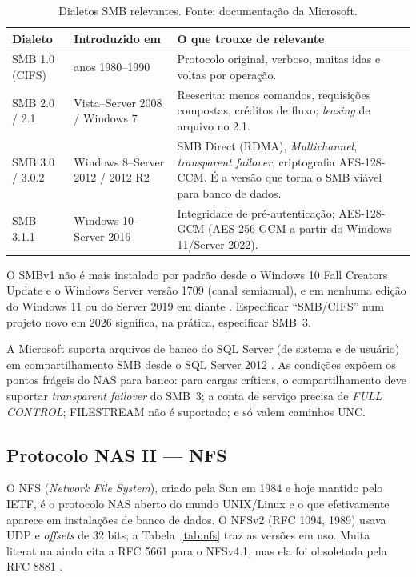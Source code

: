 \documentclass[11pt,a4paper]{article}
\begin{document}
\begin{table}[H]
\centering
\caption{Dialetos SMB relevantes. Fonte: documentação da Microsoft.}
\label{tab:smb}
{\footnotesize
\begin{tabular}{@{}L{2.1cm}L{3.6cm}L{9.0cm}@{}}
\toprule
\textbf{Dialeto} & \textbf{Introduzido em} & \textbf{O que trouxe de relevante} \\
\midrule
SMB 1.0 (CIFS) & anos 1980--1990 & Protocolo original, verboso, muitas idas e voltas por operação. \\
SMB 2.0 / 2.1 & Vista--Server 2008 / Windows 7 & Reescrita: menos comandos, requisições compostas, créditos de fluxo; \textit{leasing} de arquivo no 2.1. \\
SMB 3.0 / 3.0.2 & Windows 8--Server 2012 / 2012 R2 & SMB Direct (RDMA), \textit{Multichannel}, \textit{transparent failover}, criptografia AES-128-CCM. É a versão que torna o SMB viável para banco de dados. \\
SMB 3.1.1 & Windows 10--Server 2016 & Integridade de pré-autenticação; AES-128-GCM (AES-256-GCM a partir do Windows 11/Server 2022). \\
\bottomrule
\end{tabular}}
\end{table}

O SMBv1 não é mais instalado por padrão desde o Windows 10 Fall Creators Update e o Windows Server
versão 1709 (canal semianual), e em nenhuma edição do Windows 11 ou do Server 2019 em diante
\cite{mssmb1}. Especificar ``SMB/CIFS'' num projeto novo em 2026 significa, na prática, especificar
SMB~3.

A Microsoft suporta arquivos de banco do SQL Server (de sistema e de usuário) em compartilhamento SMB
desde o SQL Server 2012 \cite{mssqlsmb}. As condições expõem os pontos frágeis do NAS para banco: para
cargas críticas, o compartilhamento deve suportar \textit{transparent failover} do SMB~3; a conta de
serviço precisa de \textit{FULL CONTROL}; FILESTREAM não é suportado; e só valem caminhos UNC.

\subsection{Protocolo NAS II --- NFS}
\label{sec:nfs}

O NFS (\textit{Network File System}), criado pela Sun em 1984 e hoje mantido pelo IETF, é o protocolo
NAS aberto do mundo UNIX/Linux e o que efetivamente aparece em instalações de banco de dados. O NFSv2
(RFC 1094, 1989) usava UDP e \textit{offsets} de 32 bits; a Tabela~\ref{tab:nfs} traz as versões em uso.
Muita literatura ainda cita a RFC 5661 para o NFSv4.1, mas ela foi obsoletada pela RFC 8881
\cite{rfc8881}.
\end{document}
